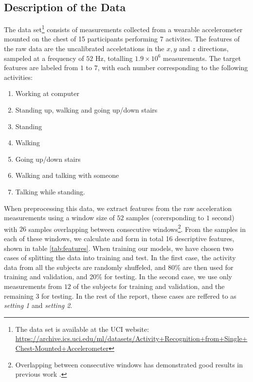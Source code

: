 \subsection{Description of the Data}
The data set\footnote{The data set is available at the UCI website: \href{https://archive.ics.uci.edu/ml/datasets/Activity+Recognition+from+Single+Chest-Mounted+Accelerometer}{https://archive.ics.uci.edu/ml/datasets/Activity+Recognition+from+Single+Chest-Mounted+Accelerometer}} consists of measurements collected from a wearable accelerometer mounted on the chest of 15 participants performing 7 activites. The features of the raw data are the uncalibrated acceletations in the $x, y$ and $z$ directions, sampeled at a frequency of $52$ Hz, totalling $1.9\times 10^6$ measurements. The target features are labeled from $1$ to $7$, with each number corresponding to the following activities:
\begin{enumerate}
    \item Working at computer
    \item Standing up, walking and going up/down stairs
    \item Standing
    \item Walking 
    \item Going up/down stairs
    \item Walking and talking with someone
    \item Talking while standing.
\end{enumerate}
When preprocessing this data, we extract features from the raw acceleration measurements using a window size of $52$ samples (corersponding to $1$ second) with $26$ samples overlapping between consecutive windows\footnote{Overlapping between consecutive windows has demonstrated good results in previous work \cite{devaul}.}. From the samples in each of these windows, we calculate and form in total 16 descriptive features, shown in table \ref{tab:features}. When training our models, we have chosen two cases of splitting the data into training and test. In the first case, the activity data from all the subjects are randomly shuffeled, and 80\% are then used for training and validation, and 20\% for testing. In the second case, we use only measurements from $12$ of the subjects for training and validation, and the remaining $3$ for testing. In the rest of the report, these cases are reffered to as \textit{setting 1} and \textit{setting 2}.


